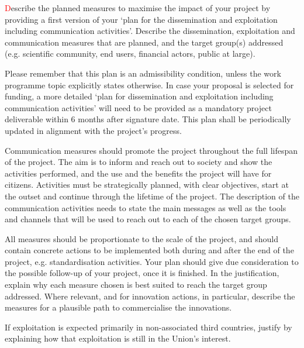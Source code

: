 \begin{draft}
  \textcolor{red}
Describe the planned measures to maximise the impact of your project by providing a first version of your ‘plan for the dissemination and exploitation including communication activities’. Describe the dissemination, exploitation and communication measures that are planned, and the target group(s) addressed (e.g. scientific community, end users, financial actors, public at large).

Please remember that this plan is an admissibility condition, unless the work programme topic explicitly states otherwise. In case your proposal is selected for funding, a more detailed ‘plan for dissemination and exploitation including communication activities’ will need to be provided as a mandatory project deliverable within 6 months after signature date. This plan shall be periodically updated in alignment with the project’s progress.

Communication measures should promote the project throughout the full lifespan of the project. The aim is to inform and reach out to society and show the activities performed, and the use and the benefits the project will have for citizens. Activities must be strategically planned, with clear objectives, start at the outset and continue through the lifetime of the project. The description of the communication activities needs to state the main messages as well as the tools and channels that will be used to reach out to each of the chosen target groups.

All measures should be proportionate to the scale of the project, and should contain concrete actions to be implemented both during and after the end of the project, e.g. standardisation activities. Your plan should give due consideration to the possible follow-up of your project, once it is finished. In the justification, explain why each measure chosen is best suited to reach the target group addressed. Where relevant, and for innovation actions, in particular, describe the measures for a plausible path to commercialise the innovations.

If exploitation is expected primarily in non-associated third countries, justify by explaining how that exploitation is still in the Union’s interest.


\end{draft}
